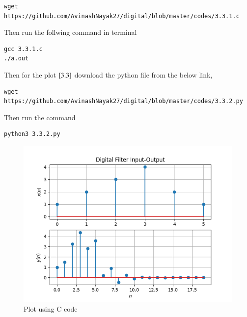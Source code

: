 \documentclass[journal,12pt,twocolumn]{IEEEtran}
\renewcommand\thesection{\arabic{section}}
\begin{document}
\begin{enumerate}[label=\thesection.\arabic*,ref=\thesection.\theenumi]
\begin{lstlisting}
wget https://github.com/AvinashNayak27/digital/blob/master/codes/3.3.1.c
   \end{lstlisting}
   Then run the follwing command in terminal
    \begin{lstlisting}
gcc 3.3.1.c
./a.out
    \end{lstlisting}
    Then for the plot $\ref{3.3}$ download the python file from the below link,
    \begin{lstlisting}
wget https://github.com/AvinashNayak27/digital/blob/master/codes/3.3.2.py
    \end{lstlisting}
    Then run the command
    \begin{lstlisting}
python3 3.3.2.py
    \end{lstlisting}
    \begin{figure}[ht!]
      \centering
      \includegraphics[width= \columnwidth]{figs/3.3.png}
      \caption{Plot using C code}
      \label{xnyn2}
    \end{figure}

\end{enumerate}
\end{document}
